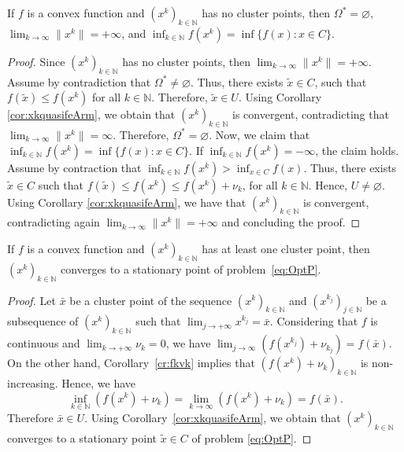 \begin{theorem}
	If $f$ is a convex function and $(x^k)_{k\in\mathbb{N}}$ has no cluster points,  then $\Omega^* = \varnothing$, $\lim_{k \to \infty} \|x^k\|= +\infty$, and $\inf_{k\in {\mathbb N}} f(x^k) = \inf \{f(x) : x \in C\}$.
\end{theorem}
\begin{proof}
	Since $(x^k)_{k\in\mathbb{N}}$ has no cluster points, then $\lim_{k \to \infty} \|x^k\|= +\infty$. Assume by contradiction that $\Omega^* \neq  \varnothing$.  Thus, there exists  $\tilde{x}\in C$, such that  $f(\tilde{x}) \leq f(x^k)$ for all $k\in {\mathbb N}$. Therefore, $\tilde{x} \in U$. Using Corollary \ref{cor:xkquasifeArm}, we obtain that $(x^k)_{k\in\mathbb{N}}$ is convergent, contradicting that $\lim_{k \to \infty} \|x^k\|= \infty$. Therefore, $\Omega^* = \varnothing$. Now, we claim that $\inf_{k\in {\mathbb N}} f(x^k) = \inf \{f(x) : x \in C\}$.   If $\inf_{k\in {\mathbb N}} f(x^k) = -\infty$, the claim holds. Assume by contraction that   $\inf_{k\in {\mathbb N}} f(x^k) >  \inf_{x \in C} f(x)$.  Thus,  there exists $\tilde{x} \in C$ such that $f(\tilde{x}) \leq f(x^k)\leq f(x^k)+\nu_k $,  for all $k\in {\mathbb N}$.  Hence, $U \neq \varnothing$.  Using Corollary \ref{cor:xkquasifeArm}, we have that  $(x^k)_{k\in\mathbb{N}}$ is convergent, contradicting again $\lim_{k \to \infty} \|x^k\|= +\infty$ and concluding the proof.
\end{proof}

\begin{corollary}
	If $f$ is a convex function and $(x^k)_{k\in\mathbb{N}}$ has at least one cluster point, then    $(x^k)_{k\in\mathbb{N}}$ converges to a stationary point of problem~\eqref{eq:OptP}.
\end{corollary}
\begin{proof}
	Let $\bar{x}$ be a cluster point of  the sequence $(x^k)_{k\in\mathbb{N}}$ and $(x^{k_j})_{j\in\mathbb{N}}$ be a subsequence of $(x^k)_{k\in\mathbb{N}}$ such that $\lim_{j\to +\infty} x^{k_j} = \bar{x}$. Considering that  $f$ is continuous and $\lim_{k\to +\infty} \nu_{k} = 0$, we have $\lim_{j \to \infty} (f(x^{k_j})+\nu_{k_j})= f(\bar{x})$.    On the other hand,  Corollary~\ref{cr:fkvk}   implies that   $(f(x^{k})+\nu_k)_{k\in\mathbb{N}}$ is non-increasing.  Hence, we have
	$$\inf_{k\in {\mathbb N}} (f(x^{k})+\nu_{k})=\lim_{k\to \infty} (f(x^{k})+\nu_{k})= f(\bar{x}).$$
	Therefore $\bar{x} \in U$. Using  Corollary~\ref{cor:xkquasifeArm}, we obtain that $(x^k)_{k\in\mathbb{N}}$ converges to a stationary point $\tilde{x}\in C$ of  problem \eqref{eq:OptP}.
\end{proof}

